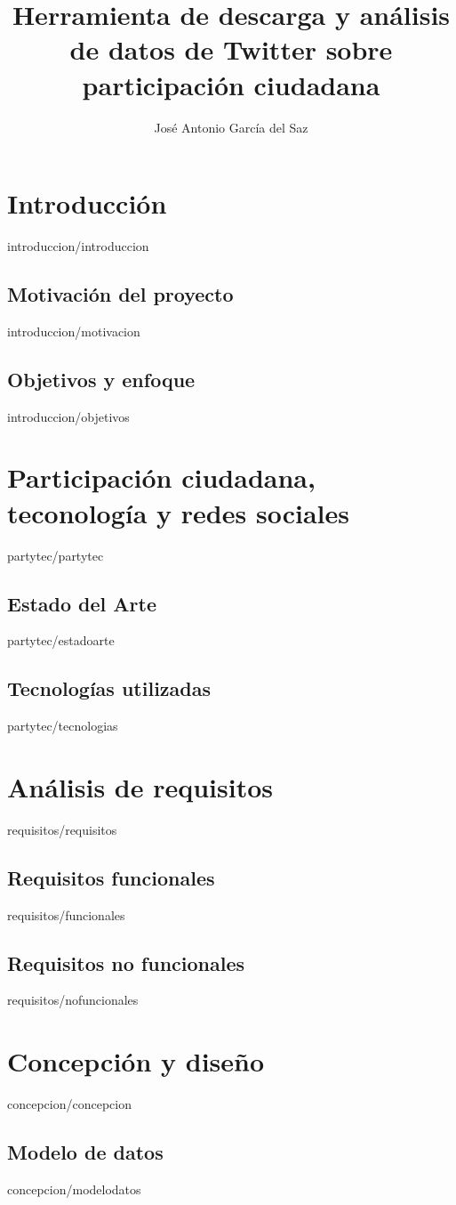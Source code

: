 \documentclass[epsbased,copyright,final,printable,covers,extendedindex,firstnumbered,tfg,gnuplot]{tfgtfmthesisuam}
\title{Herramienta de descarga y análisis de datos de Twitter sobre participación ciudadana}
\author{José Antonio García del Saz}
\begin{document}
\chapter{Introducción\label{CAP:INTRO}}{introduccion/introduccion}
	\section{Motivación del proyecto\label{SEC:MOTIVACION}}{introduccion/motivacion}
	\section{Objetivos y enfoque\label{SEC:OBJETIVOS}}{introduccion/objetivos}
\chapter{Participación ciudadana, teconología y redes sociales\label{CAP:PARTCIUDADANAYTEC}}{partytec/partytec}
		\section{Estado del Arte\label{SEC:ESTADOARTE}}{partytec/estadoarte}
		\section{Tecnologías utilizadas\label{SEC:TECUTILIZADAS}}{partytec/tecnologias}
\chapter{Análisis de requisitos\label{CAP:REQUISITOS}}{requisitos/requisitos}
	\section{Requisitos funcionales\label{SEC:REQFUNCIONALES}}{requisitos/funcionales}
	\section{Requisitos no funcionales\label{SEC:REQNOFUNCIONALES}}{requisitos/nofuncionales}
\chapter{Concepción y diseño\label{CAP:CONCEPCION}}{concepcion/concepcion}
	\section{Modelo de datos\label{SEC:MODELODATOS}}{concepcion/modelodatos}
\end{document}
